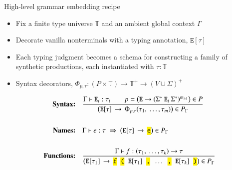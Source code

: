 \documentclass{beamer}
\newcommand{\codett}[1]{\texttt{\hl{#1}}}
\newcommand{\nt}[1]{\texttt{#1}}      %
\newcommand{\tok}[1]{\codett{#1}}     %
\newcommand{\gap}{\;\;}
\begin{document}
\begin{frame}{High-level grammar embedding recipe}

  \begin{itemize}\setlength\itemsep{0.35em}
  \item Fix a finite type universe $\mathbb{T}$ and an ambient global context $\Gamma$
  \item Decorate vanilla nonterminals with a typing annotation, $\nt{E}[\tau]$
  \item Each typing judgment becomes a schema for constructing a family of synthetic productions, each instantiated with $\tau : \mathbb{T}$
  \item Syntax decorators, $\Phi_{p, \tau}:(P \times \mathbb{T}) \rightarrow \mathbb{T}^+ \rightarrow (V \cup \Sigma)^+$
  \end{itemize}
  \vspace{-0.2cm}
  \hspace{-0.3cm}\begin{align*}
    \textbf{Syntax:}&\quad
    \frac{\Gamma \vdash \nt{E}_i:\tau_i \qquad p=\big(\nt{E} \rightarrow (\Sigma^*\:\nt{E}_i\:\Sigma^*)^{m_{\geq 1}}\big) \in P}{\big(\nt{E}[\tau]\,\rightarrow\, \Phi_{p,\tau}(\tau_1,\ \ldots,\tau_m)\big)\in P_\Gamma}\\\\
    \textbf{Names:}&\quad
    \Gamma \vdash e:\tau \;\Rightarrow\; \big(\nt{E}[\tau]\,\rightarrow\,\tok{e}\big)\in P_\Gamma\\\\
    \textbf{Functions:}&\quad
    \frac{\Gamma \vdash f:(\tau_1,\ \ldots, \tau_k) \rightarrow \tau}{\big(\nt{E}[\tau_1]\,\rightarrow\,\tok{f}\gap\tok{(}\gap\nt{E}[\tau_1]\gap\tok{,}\gap \ldots\gap\tok{,}\gap\nt{E}[\tau_k]\gap\tok{)} \big)\in P_\Gamma}
  \end{align*}
  \begin{itemize}\setlength\itemsep{0.25em}
  \end{itemize}
\end{frame}
\end{document}
